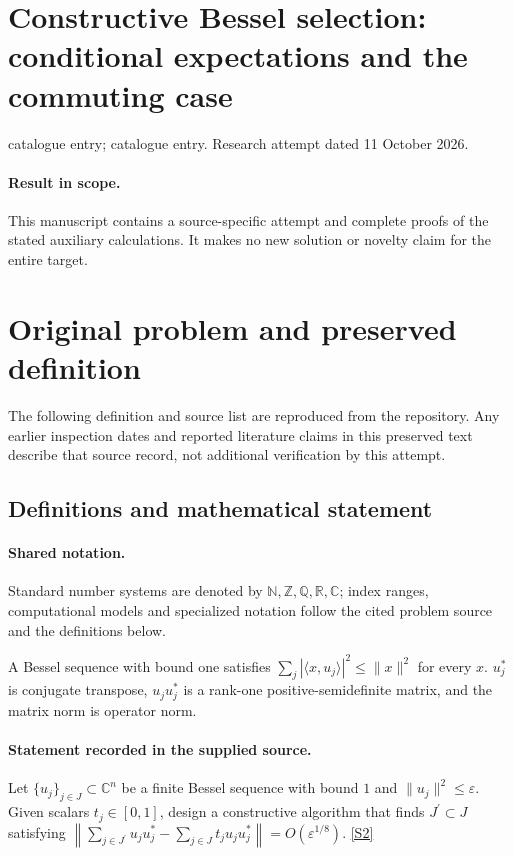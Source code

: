 \documentclass[11pt]{article}
\begin{document}
\section*{Constructive Bessel selection: conditional expectations and the commuting case}
\noindent catalogue entry; catalogue entry. Research attempt dated 11 October 2026.
\paragraph{Result in scope.}This manuscript contains a source-specific attempt and complete proofs of the stated auxiliary calculations. It makes no new solution or novelty claim for the entire target.
\section{Original problem and preserved definition}
The following definition and source list are reproduced from the repository. Any earlier inspection dates and reported literature claims in this preserved text describe that source record, not additional verification by this attempt.
\subsection{Definitions and mathematical statement}

\paragraph{Shared notation.}Standard number systems are denoted by $\mathbb N,\mathbb Z,\mathbb Q,\mathbb R,\mathbb C$; index ranges, computational models and specialized notation follow the cited problem source and the definitions below.


A Bessel sequence with bound one satisfies $\sum_j|\langle x,u_j\rangle|^2\leq\lVert x\rVert^2$ for every $x$. $u_j^*$ is conjugate transpose, $u_ju_j^*$ is a rank-one positive-semidefinite matrix, and the matrix norm is operator norm.
\paragraph{Statement recorded in the supplied source.}
Let $\{u_j\}_{j\in J}\subset\mathbb{C}^n$ be a finite Bessel sequence with bound $1$ and $\lVert u_j\rVert^2\leq\varepsilon$. Given scalars $t_j\in[0,1]$, design a constructive algorithm that finds $J^\prime\subset J$ satisfying $\left\lVert\sum_{j\in J^\prime}u_ju_j^*-\sum_{j\in J}t_ju_ju_j^*\right\rVert=O(\varepsilon^{1/8})$. \href{https://doi.org/10.4171/owr/2015/17}{[S2]}
\end{document}
